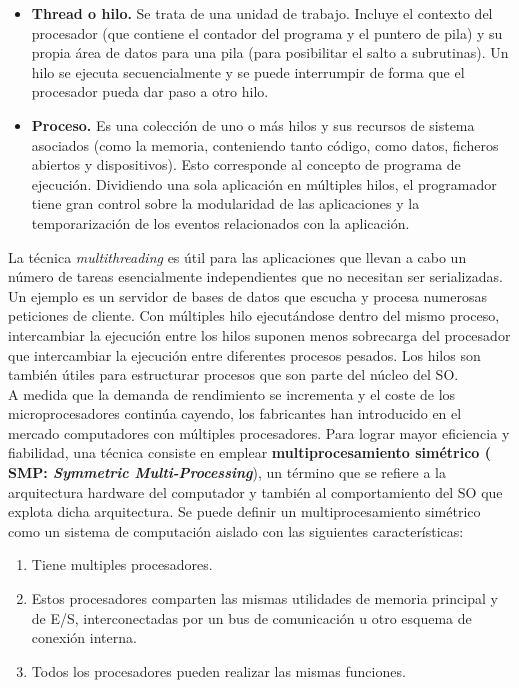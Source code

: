 \documentclass{article}
\begin{document}
			\begin{itemize}
			\item \textbf{Thread o hilo.} Se trata de una unidad de trabajo. Incluye el contexto del procesador (que contiene el contador del programa y el puntero de pila) y su propia área de datos para una pila (para posibilitar el salto a subrutinas). Un hilo se ejecuta secuencialmente y se puede interrumpir de forma que el procesador pueda dar paso a otro hilo.
			\item \textbf{Proceso.} Es una colección de uno o más hilos y sus recursos de sistema asociados (como la memoria, conteniendo tanto código, como datos, ficheros abiertos y dispositivos). Esto corresponde al concepto de programa de ejecución. Dividiendo una sola aplicación en múltiples hilos, el programador tiene gran control sobre la modularidad de las aplicaciones y la temporarización de los eventos relacionados con la aplicación.
			\end{itemize}
			
			La técnica \textit{multithreading} es útil para las aplicaciones que llevan a cabo un número de tareas esencialmente independientes que no necesitan ser serializadas. Un ejemplo es un servidor de bases de datos que escucha y procesa numerosas peticiones de cliente. Con múltiples hilo ejecutándose dentro del mismo proceso, intercambiar la ejecución entre los hilos suponen menos sobrecarga del procesador que intercambiar la ejecución entre diferentes procesos pesados. Los hilos son también útiles para estructurar procesos que son parte del núcleo del SO. \\
			
			A medida que la demanda de rendimiento se incrementa y el coste de los microprocesadores continúa cayendo, los fabricantes han introducido en el mercado computadores con múltiples procesadores. Para lograr mayor eficiencia y fiabilidad, una técnica consiste en emplear \textbf{multiprocesamiento simétrico (	SMP: \textit{Symmetric Multi-Processing}}), un término que se refiere a la arquitectura hardware del computador y también al comportamiento del SO que explota dicha arquitectura. Se puede definir un multiprocesamiento simétrico como un sistema de computación aislado con las siguientes características:
			
			\begin{enumerate}
			\item Tiene multiples procesadores.
			\item Estos procesadores comparten las mismas utilidades de memoria principal y de E/S, interconectadas por un bus de comunicación u otro esquema de conexión interna.
			\item Todos los procesadores pueden realizar las mismas funciones.
			\end{enumerate}
			
\end{document}
